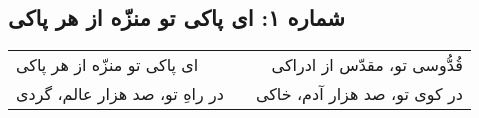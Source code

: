 \begin{center}
\section*{شماره ۱: ای پاکی تو منزّه از هر پاکی}
\label{sec:001}
\begin{longtable}{l p{0.5cm} r}
ای پاکی تو منزّه از هر پاکی
&&
قُدُّوسی تو، مقدّس از ادراکی
\\
در راهِ تو، صد هزار عالم، گردی
&&
در کوی تو، صد هزار آدم، خاکی
\\
\end{longtable}
\end{center}
